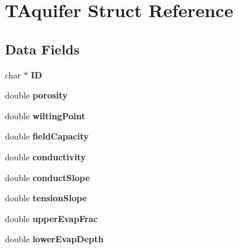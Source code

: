 \hypertarget{struct_t_aquifer}{}\section{T\+Aquifer Struct Reference}
\label{struct_t_aquifer}
\subsection*{Data Fields}
\begin{DoxyCompactItemize}
\item 
\mbox{\label{struct_t_aquifer_a63756a4a33a8c806e584babb52907653}} 
char $\ast$ {\bfseries ID}
\item 
\mbox{\label{struct_t_aquifer_a38299b3e08d348a2a1c11cac9a7f01bd}} 
double {\bfseries porosity}
\item 
\mbox{\label{struct_t_aquifer_ad3d444396deacf2c4f599b30e408220e}} 
double {\bfseries wilting\+Point}
\item 
\mbox{\label{struct_t_aquifer_a1dcef14b569cca42bc16ed3d1dcce332}} 
double {\bfseries field\+Capacity}
\item 
\mbox{\label{struct_t_aquifer_a36600d35b797dea8c54c04bf006fe1ab}} 
double {\bfseries conductivity}
\item 
\mbox{\label{struct_t_aquifer_a6c10cd4355f78c655585ab8735384aeb}} 
double {\bfseries conduct\+Slope}
\item 
\mbox{\label{struct_t_aquifer_aea6700bac62348e24c706e048988d70a}} 
double {\bfseries tension\+Slope}
\item 
\mbox{\label{struct_t_aquifer_a25fd38fb804a1bf3db42918f50df5110}} 
double {\bfseries upper\+Evap\+Frac}
\item 
\mbox{\label{struct_t_aquifer_a4354167952f9de0aa8bae6e2e3aa34c9}} 
double {\bfseries lower\+Evap\+Depth}
\item 
\mbox{\label{struct_t_aquifer_a2b5940434fc93126a066135eb3303224}} 

\end{DoxyCompactItemize}
